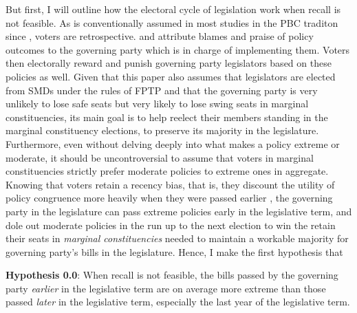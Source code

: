 \documentclass{article}
\begin{document}
		But first, I will outline how the electoral cycle of legislation work
		when recall is not feasible.
		As is conventionally assumed in
		most studies in the PBC traditon since 
		\citeauthor{nordhausPoliticalBusinessCycle1975}
		\autocite*{nordhausPoliticalBusinessCycle1975},
		voters are retrospective.
		and
		attribute blames and praise of policy outcomes
		to the governing party which is
		in charge of implementing them.
		Voters then electorally reward and punish governing party legislators
		based on these policies as well.
		Given that this paper also assumes that
		legislators are elected from SMDs under the rules of FPTP
		and that the governing party is very unlikely to lose safe seats
		but very likely to lose swing seats in marginal constituencies,
		its main goal is to help reelect their members
		standing in the marginal constituency elections,
		to preserve its majority in the legislature.
		Furthermore,
		even without delving deeply into what makes a policy
		extreme or moderate,
		it should be uncontroversial to assume that
		voters in marginal constituencies
		strictly prefer moderate policies to extreme ones
		in aggregate.
		Knowing
		that voters
		retain a recency bias,
		that is,
		they
		discount the utility of policy congruence
		more heavily
		when they
		were passed earlier
		\autocite{healySubstitutingEndWhole2014,
			stroblElectoralCyclesGovernment2021},
		the governing party in the legislature
		can pass extreme policies early in the legislative term,
		and dole out moderate policies in the run up to the next election
		to win the retain their seats in \textit{marginal constituencies}
		needed to maintain a workable majority for governing party's bills
		in the legislature.
		Hence,
		I make the first hypothesis that
		
		\textbf{Hypothesis 0.0}: When recall is not feasible,
		the bills passed by the governing party
		\textit{earlier} in the legislative term are on average  
		more extreme than those passed \textit{later} in the legislative term,
		especially the last year of the legislative term.
%		
%		
		
\end{document}
